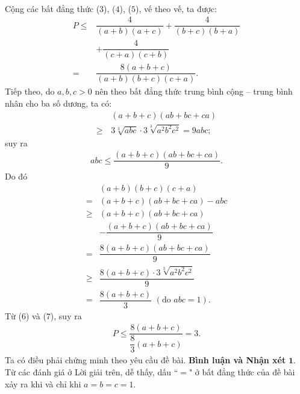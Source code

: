 \begin{multicols}{2}
\begin{align*}
	\end{align*}
	Cộng các bất đẳng thức ($3$), ($4$), ($5$), vế theo vế, ta được:
	\begin{align*}
		P \le &\dfrac{4}{{\left( {a + b} \right)\left( {a + c} \right)}} + \dfrac{4}{{\left( {b + c} \right)\left( {b + a} \right)}} \\
		&+ \dfrac{4}{{\left( {c + a} \right)\left( {c + b} \right)}} \\
		= &\dfrac{{8\left( {a + b + c} \right)}}{{\left( {a + b} \right)\left( {b + c} \right)\left( {c + a} \right)}}. \tag{$6$}
	\end{align*}
	Tiếp theo, do $a, b, c > 0$ nên theo bất đẳng thức trung bình cộng -- trung bình nhân cho ba số dương, ta có:
	\begin{align*}
		&\left( {a + b + c} \right)\left( {ab + bc + ca} \right)\\
		 \ge \,&3\sqrt[3]{{abc}} \cdot 3\sqrt[3]{{{a^2}{b^2}{c^2}}} = 9abc;
	\end{align*}
	suy ra
	\begin{align*}
		abc \le \dfrac{{\left( {a + b + c} \right)\left( {ab + bc + ca} \right)}}{9}.
	\end{align*}
	Do đó
	\begin{align*}
		&\left( {a + b} \right)\left( {b + c} \right)\left( {c + a} \right) \\
		= &\left( {a + b + c} \right)\left( {ab + bc + ca} \right) - abc\\
		\ge& \left( {a + b + c} \right)\left( {ab + bc + ca} \right) \\
		&- \dfrac{{\left( {a + b + c} \right)\left( {ab + bc + ca} \right)}}{9}\\
		= &\dfrac{{8\left( {a + b + c} \right)\left( {ab + bc + ca} \right)}}{9}\\
		\ge& \dfrac{{8\left( {a + b + c} \right) \cdot 3\sqrt[3]{{{a^2}{b^2}{c^2}}}}}{9}\\
		= &\dfrac{{8\left( {a + b + c} \right)}}{3}\,\,({\text{do }}abc = 1). \tag{$7$}
	\end{align*}
	Từ ($6$) và ($7$), suy ra
	\begin{align*}
		P \le \dfrac{{8\left( {a + b + c} \right)}}{{\dfrac{8}{3}\left( {a + b + c} \right)}} = 3.
	\end{align*}
	Ta có điều phải chứng minh theo yêu cầu đề bài.
	\vskip 0.05cm
	\textbf{\color{thachthuctoanhoc}Bình luận và Nhận xét}
	\vskip 0.05cm
	$\pmb{1.}$ Từ các đánh giá ở Lời giải trên, dễ thấy, dấu ``$=$" ở bất đẳng thức của đề bài xảy ra khi và chỉ khi $a = b = c = 1$.

\end{multicols}
